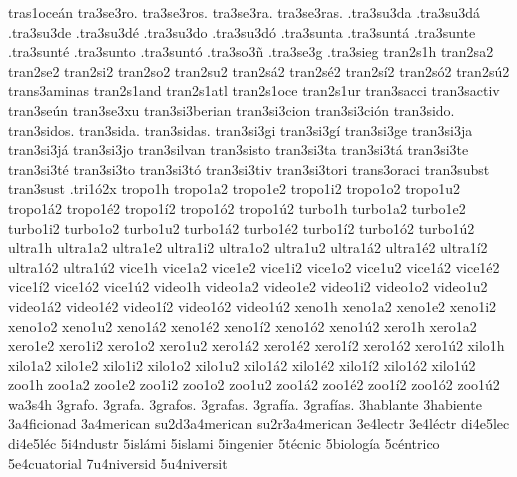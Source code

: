 {tras1oceán
tra3se3ro.
tra3se3ros.
tra3se3ra.
tra3se3ras.
.tra3su3da
.tra3su3dá
.tra3su3de
.tra3su3dé
.tra3su3do
.tra3su3dó
.tra3sunta
.tra3suntá
.tra3sunte
.tra3sunté
.tra3sunto
.tra3suntó
.tra3so3ñ
.tra3se3g
.tra3sieg
tran2s1h
tran2sa2 tran2se2 tran2si2 tran2so2 tran2su2
tran2sá2 tran2sé2 tran2sí2 tran2só2 tran2sú2
trans3aminas
tran2s1and
tran2s1atl
tran2s1oce
tran2s1ur
tran3sacci
tran3sactiv
tran3seún
tran3se3xu
tran3si3berian
tran3si3cion
tran3si3ción
tran3sido.
tran3sidos.
tran3sida.
tran3sidas.
tran3si3gi
tran3si3gí
tran3si3ge
tran3si3ja
tran3si3já
tran3si3jo
tran3silvan
tran3sisto
tran3si3ta
tran3si3tá
tran3si3te
tran3si3té
tran3si3to
tran3si3tó
tran3si3tiv
tran3si3tori
trans3oraci
tran3subst
tran3sust
.tri1ó2x
tropo1h
tropo1a2 tropo1e2 tropo1i2 tropo1o2 tropo1u2
tropo1á2 tropo1é2 tropo1í2 tropo1ó2 tropo1ú2
turbo1h
turbo1a2 turbo1e2 turbo1i2 turbo1o2 turbo1u2
turbo1á2 turbo1é2 turbo1í2 turbo1ó2 turbo1ú2
ultra1h
ultra1a2 ultra1e2 ultra1i2 ultra1o2 ultra1u2
ultra1á2 ultra1é2 ultra1í2 ultra1ó2 ultra1ú2
vice1h
vice1a2 vice1e2 vice1i2 vice1o2 vice1u2
vice1á2 vice1é2 vice1í2 vice1ó2 vice1ú2
video1h
video1a2 video1e2 video1i2 video1o2 video1u2
video1á2 video1é2 video1í2 video1ó2 video1ú2
xeno1h
xeno1a2 xeno1e2 xeno1i2 xeno1o2 xeno1u2
xeno1á2 xeno1é2 xeno1í2 xeno1ó2 xeno1ú2
xero1h
xero1a2 xero1e2 xero1i2 xero1o2 xero1u2
xero1á2 xero1é2 xero1í2 xero1ó2 xero1ú2
xilo1h
xilo1a2 xilo1e2 xilo1i2 xilo1o2 xilo1u2
xilo1á2 xilo1é2 xilo1í2 xilo1ó2 xilo1ú2
zoo1h
zoo1a2 zoo1e2 zoo1i2 zoo1o2 zoo1u2
zoo1á2 zoo1é2 zoo1í2 zoo1ó2 zoo1ú2
wa3s4h
3grafo.
3grafa.
3grafos.
3grafas.
3grafía.
3grafías.
3hablante
3habiente
3a4ficionad
3a4merican
su2d3a4merican
su2r3a4merican
3e4lectr
3e4léctr
di4e5lec
di4e5léc
5i4ndustr
5islámi
5islami
5ingenier
5técnic
5biología
5céntrico
5e4cuatorial
7u4niversid
5u4niversit
}
